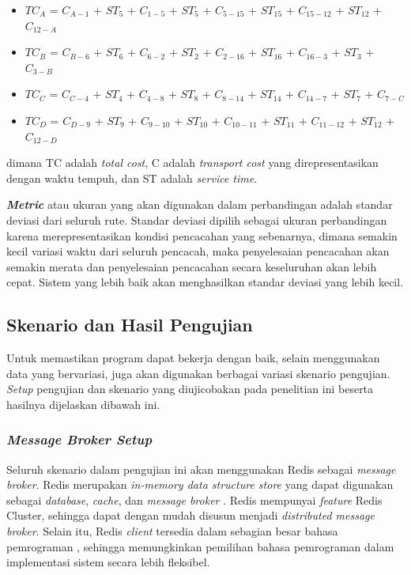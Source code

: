 \begin{itemize}
	\item $TC_A$ = $C_{A-1}$ + $ST_5$ + $C_{1-5}$ + $ST_5$ + $C_{5-15}$ + $ST_15$ + $C_{15-12}$ + $ST_12$ + $C_{12-A}$
	\item $TC_B$ = $C_{B-6}$ + $ST_6$ + $C_{6-2}$ + $ST_2$ + $C_{2-16}$ + $ST_16$ + $C_{16-3}$ + $ST_3$ + $C_{3-B}$
	\item $TC_C$ = $C_{C-4}$ + $ST_4$ + $C_{4-8}$ + $ST_8$ + $C_{8-14}$ + $ST_14$ + $C_{14-7}$ + $ST_7$ + $C_{7-C}$
	\item $TC_D$ = $C_{D-9}$ + $ST_9$ + $C_{9-10}$ + $ST_10$ + $C_{10-11}$ + $ST_11$ + $C_{11-12}$ + $ST_12$ + $C_{12-D}$
\end{itemize}
dimana TC adalah \textit{total cost}, C adalah \textit{transport cost} yang direpresentasikan dengan waktu tempuh, dan ST adalah \textit{service time}.


\textbf{\textit{Metric}} atau ukuran yang akan digunakan dalam perbandingan adalah standar deviasi dari seluruh rute. Standar deviasi dipilih sebagai ukuran perbandingan karena merepresentasikan kondisi pencacahan yang sebenarnya, dimana semakin kecil variasi waktu dari seluruh pencacah, maka penyelesaian pencacahan akan semakin merata dan penyelesaian pencacahan secara keseluruhan akan lebih cepat. Sistem yang lebih baik akan menghasilkan standar deviasi yang lebih kecil.


\subsection{Skenario dan Hasil Pengujian}
Untuk memastikan program dapat bekerja dengan baik, selain menggunakan data yang bervariasi, juga akan digunakan berbagai variasi skenario pengujian. \textit{Setup} pengujian dan skenario yang diujicobakan pada penelitian ini beserta hasilnya dijelaskan dibawah ini.


\subsubsection{\textit{Message Broker Setup}}
Seluruh skenario dalam pengujian ini akan menggunakan Redis sebagai \textit{message broker}. Redis merupakan \textit{in-memory data structure store} yang dapat digunakan sebagai \textit{database}, \textit{cache}, dan \textit{message broker} \citep{redis_introduction_2017}. Redis mempunyai \textit{feature} Redis Cluster, sehingga dapat dengan mudah disusun menjadi \textit{distributed message broker}. Selain itu, Redis \textit{client} tersedia dalam sebagian besar bahasa pemrograman \citep{redis_clients_2017}, sehingga memungkinkan pemilihan bahasa pemrograman dalam implementasi sistem secara lebih fleksibel.


